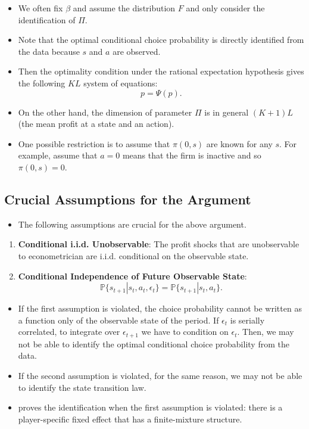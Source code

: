 \documentclass[
]{book}
\providecommand{\tightlist}{%
  \setlength{\itemsep}{0pt}\setlength{\parskip}{0pt}}
\begin{document}
\begin{itemize}
\tightlist
\item
  We often fix \(\beta\) and assume the distribution \(F\) and only consider the identification of \(\Pi\).
\item
  Note that the optimal conditional choice probability is directly identified from the data because \(s\) and \(a\) are observed.
\item
  Then the optimality condition under the rational expectation hypothesis gives the following \(KL\) system of equations:
  \[
  p = \Psi(p).
  \]
\item
  On the other hand, the dimension of parameter \(\Pi\) is in general \((K + 1)L\) (the mean profit at a state and an action).
\item
  One possible restriction is to assume that \(\pi(0, s)\) are known for any \(s\). For example, assume that \(a = 0\) means that the firm is inactive and so \(\pi(0, s) = 0\).
\end{itemize}

\hypertarget{crucial-assumptions-for-the-argument}{%
\subsection{Crucial Assumptions for the Argument}\label{crucial-assumptions-for-the-argument}}

\begin{itemize}
\tightlist
\item
  The following assumptions are crucial for the above argument.
\end{itemize}

\begin{enumerate}
\def\labelenumi{\arabic{enumi}.}
\tightlist
\item
  \textbf{Conditional i.i.d. Unobservable}: The profit shocks that are unobservable to econometrician are i.i.d. conditional on the observable state.
\item
  \textbf{Conditional Independence of Future Observable State}:
  \begin{equation}
  \mathbb{P}\{s_{t + 1}|s_t, a_t, \epsilon_t\} = \mathbb{P}\{s_{t + 1}|s_t, a_t\}.
  \end{equation}
\end{enumerate}

\begin{itemize}
\tightlist
\item
  If the first assumption is violated, the choice probability cannot be written as a function only of the observable state of the period. If \(\epsilon_t\) is serially correlated, to integrate over \(\epsilon_{t + 1}\) we have to condition on \(\epsilon_t\). Then, we may not be able to identify the optimal conditional choice probability from the data.
\item
  If the second assumption is violated, for the same reason, we may not be able to identify the state transition law.
\item
  \citet{kasaharaNonparametricIdentificationFinite2009} proves the identification when the first assumption is violated: there is a player-specific fixed effect that has a finite-mixture structure.
\end{itemize}
\end{document}
